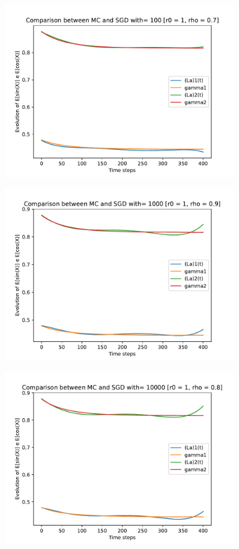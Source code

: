 \documentclass[a4paper,11pt,openright]{report}
\begin{document}
\begin{figure}[H]
\centering
\includegraphics[width=0.9\textwidth]{images/graphs T = 4/n = 5, M = 100 sine and cosine.pdf}
\end{figure}
\begin{figure}[H]
\centering
\includegraphics[width=0.9\textwidth]{images/graphs T = 4/n = 5, M = 1000 sine and cosine.pdf}
\end{figure}
\begin{figure}[H]
\centering
\includegraphics[width=0.9\textwidth]{images/graphs T = 4/n = 5, M = 10000 sine and cosine.pdf}
\end{figure}
\newpage
\end{document}

